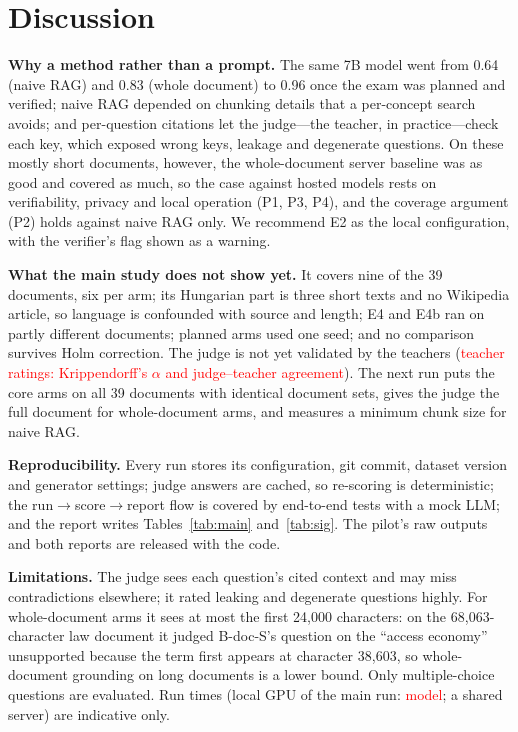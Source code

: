 \documentclass[conference]{IEEEtran}
\newcommand{\tbd}[1]{\textcolor{red}{#1}}
\begin{document}
\section{Discussion}

\textbf{Why a method rather than a prompt.} The same 7B model went from 0.64 (naive RAG) and 0.83 (whole
document) to 0.96 once the exam was planned and verified; naive RAG depended on chunking details that a
per-concept search avoids; and per-question citations let the judge---the teacher, in practice---check
each key, which exposed wrong keys, leakage and degenerate questions. On these mostly short documents,
however, the whole-document server baseline was as good and covered as much, so the case against hosted
models rests on verifiability, privacy and local operation (P1, P3, P4), and the coverage argument (P2)
holds against naive RAG only. We recommend E2 as the local configuration, with the verifier's flag shown
as a warning.

\textbf{What the main study does not show yet.} It covers nine of the 39 documents, six per arm; its
Hungarian part is three short texts and no Wikipedia article, so language is confounded with source and
length; E4 and E4b ran on partly different documents; planned arms used one seed; and no comparison
survives Holm correction. The judge is not yet validated by the teachers
(\tbd{teacher ratings: Krippendorff's $\alpha$ and judge--teacher agreement}). The next run puts the core
arms on all 39 documents with identical document sets, gives the judge the full document for
whole-document arms, and measures a minimum chunk size for naive RAG.

\textbf{Reproducibility.} Every run stores its configuration, git commit, dataset version and generator
settings; judge answers are cached, so re-scoring is deterministic; the run$\to$score$\to$report flow is
covered by end-to-end tests with a mock LLM; and the report writes Tables~\ref{tab:main}
and~\ref{tab:sig}. The pilot's raw outputs and both reports are released with the code.

\textbf{Limitations.} The judge sees each question's cited context and may miss contradictions elsewhere;
it rated leaking and degenerate questions highly. For whole-document arms it sees at most the first
24{,}000 characters: on the 68{,}063-character law document it judged B-doc-S's question on the ``access
economy'' unsupported because the term first appears at character 38{,}603, so whole-document grounding on
long documents is a lower bound. Only multiple-choice questions are evaluated. Run times (local GPU of the main run:
\tbd{model}; a shared server) are indicative only.
\end{document}
